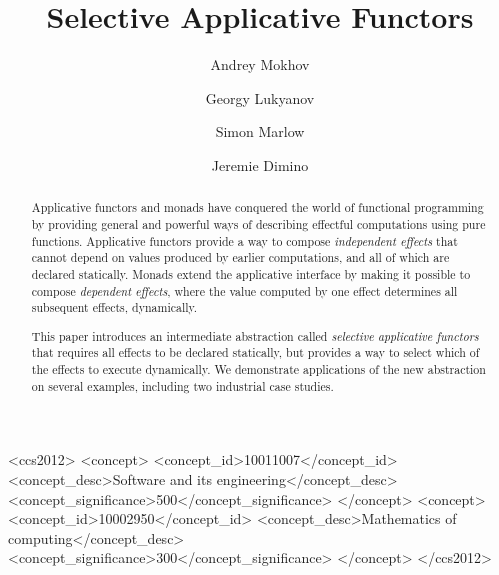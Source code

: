 \documentclass[acmsmall,screen]{acmart}
\begin{document}
\title{Selective Applicative Functors}


\author{Andrey Mokhov}
\author{Georgy Lukyanov}
\author{Simon Marlow}
\author{Jeremie Dimino}


\begin{abstract}
Applicative functors and monads have conquered the world of functional
programming by providing general and powerful ways of describing effectful
computations using pure functions. Applicative functors provide a way to compose
\emph{independent effects} that cannot depend on values produced by earlier
computations, and all of which are declared statically. Monads extend the
applicative interface by making it possible to compose \emph{dependent effects},
where the value computed by one effect determines all subsequent effects,
dynamically.

This paper introduces an intermediate abstraction called \emph{selective
applicative functors} that requires all effects to be declared statically, but
provides a way to select which of the effects to execute dynamically. We
demonstrate applications of the new abstraction on several examples, including
two industrial case studies.
\end{abstract}

\begin{CCSXML}
<ccs2012>
<concept>
<concept_id>10011007</concept_id>
 <concept_desc>Software and its engineering</concept_desc>
<concept_significance>500</concept_significance>
</concept>
<concept>
<concept_id>10002950</concept_id>
 <concept_desc>Mathematics of computing</concept_desc>
<concept_significance>300</concept_significance>
</concept>
</ccs2012>
\end{CCSXML}
\end{document}
